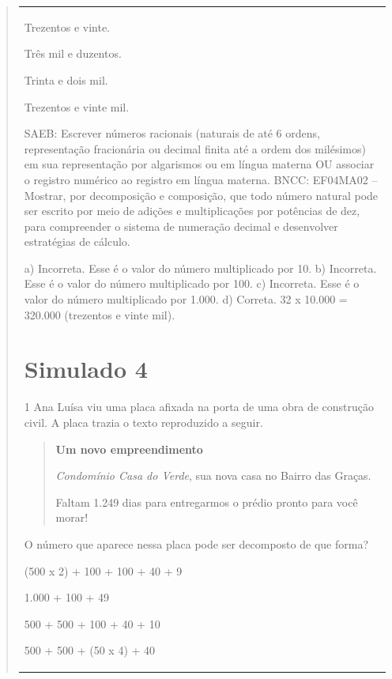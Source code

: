 \begin{mdframed}[linewidth=2pt,linecolor=salmao,roundcorner=2pt]
\begin{itemize}
{\begin{itemize}
\begin{escolha}
{\begin{quote}
{\begin{escolha}
{{{{{\begin{longtable}[]{@{}l@{}}
\begin{itemize}
{\begin{escolha}
\item Trezentos e vinte.
\item Três mil e duzentos.
\item Trinta e dois mil.
\item Trezentos e vinte mil.
\end{escolha}

SAEB: Escrever números racionais (naturais de até 6 ordens, representação
fracionária ou decimal finita até a ordem dos milésimos) em sua
representação por algarismos ou em língua materna OU associar o registro
numérico ao registro em língua materna.
BNCC: EF04MA02 -- Mostrar, por decomposição e composição, que todo número natural pode ser escrito
por meio de adições e multiplicações por potências de dez, para compreender o sistema de
numeração decimal e desenvolver estratégias de cálculo.

a) Incorreta. Esse é o valor do número multiplicado por 10.
b) Incorreta. Esse é o valor do número multiplicado por 100.
c) Incorreta. Esse é o valor do número multiplicado por 1.000.
d) Correta. 32 x 10.000 = 320.000 (trezentos e vinte mil).

\chapter{Simulado 4}
\markboth{Simulado 4}{}

\num{1} Ana Luísa viu uma placa afixada na porta de uma obra de construção civil. A placa trazia o texto reproduzido a seguir.

\begin{quote}
\textbf{Um novo empreendimento}

\textit{Condomínio Casa do Verde}, sua nova casa no Bairro das Graças.

Faltam 1.249 dias para entregarmos o prédio pronto para você morar!
\end{quote}

O número que aparece nessa placa pode ser decomposto de que forma?

\begin{escolha}
\item (500 x 2) + 100 + 100 + 40 + 9
\item 1.000 + 100 + 49  
\item 500 + 500 + 100 + 40 + 10  
\item 500 + 500 + (50 x 4) + 40
  
\end{escolha}

}
\end{itemize}
\end{longtable}}}}}}
\end{escolha}}
\end{quote}}
\end{escolha}
\end{itemize}}
\end{itemize}
\end{mdframed}
